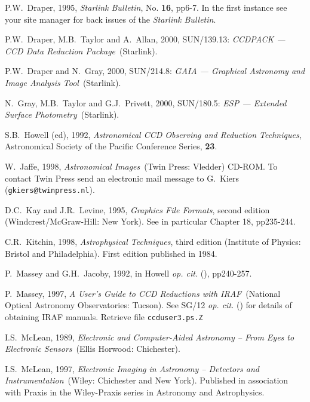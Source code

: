 \documentclass[twoside,11pt]{article}
\newcommand{\htmladdnormallink}[2]{#1}
\newcommand{\latex}[1]{#1}
\newcommand{\xref}[3]{#1}
\begin{document}
\begin{thebibliography}{99}
   P.W.~Draper, 1995,
  \htmladdnormallink{{\it Starlink Bulletin}}
   {http://www.starlink.ac.uk//bulletin.html},
   No. {\bf 16}, pp6-7.  In the first instance see your site manager
   for back issues of the {\it Starlink Bulletin}.

   P.W.~Draper, M.B.~Taylor and A.~Allan, 2000,
   \xref{SUN/139.13}{sun139}{}: {\it CCDPACK --- CCD Data Reduction
   Package}\, (Starlink).

   P.W.~Draper and N.~Gray, 2000,
   \xref{SUN/214.8}{sun214}{}: {\it GAIA --- Graphical Astronomy and Image
   Analysis Tool}\, (Starlink).

   N.~Gray, M.B.~Taylor and G.J.~Privett, 2000,
   \xref{SUN/180.5}{sun180}{}: {\it ESP --- Extended Surface Photometry}\,
   (Starlink).

   S.B.~Howell (ed), 1992, {\it Astronomical CCD
   Observing and Reduction Techniques}, Astronomical Society of the
   Pacific Conference Series, {\bf 23}.

   W.~Jaffe, 1998, {\it Astronomical Images}\,
   (Twin Press: Vledder) CD-ROM.  To contact Twin Press send an electronic
   mail message to G.~Kiers ({\tt gkiers@twinpress.nl}).

   D.C.~Kay and J.R.~Levine, 1995, {\it Graphics File
   Formats}, second edition
  \newline (Windcrest/McGraw-Hill: New York).  See in particular
   Chapter 18, pp235-244.

   C.R.~Kitchin, 1998, {\it Astrophysical Techniques},
   third edition (Institute of Physics: Bristol and Philadelphia).
   First edition published in 1984.

   P.~Massey and G.H.~Jacoby, 1992, in Howell
   {\it op. cit.}\/ (\cite{HOWELL92}), pp240-257.

   P.~Massey, 1997, {\it A User's Guide to CCD
   Reductions with IRAF}\, (National Optical Astronomy Observatories:
   Tucson).  See \xref{SG/12}{sg12}{} {\it op. cit.}\/ (\cite{SG12}) for
   details of obtaining IRAF manuals.  Retrieve file {\tt ccduser3.ps.Z}

   I.S.~McLean, 1989, {\it Electronic and Computer-Aided
   Astronomy -- From Eyes to Electronic Sensors}\, (Ellis Horwood:
   Chichester).

   I.S.~McLean, 1997, {\it Electronic Imaging in
   Astronomy -- Detectors and Instrumentation}\, (Wiley: Chichester and
   New York).  Published in association with Praxis in the Wiley-Praxis
   series in Astronomy and Astrophysics.


\end{thebibliography}
\end{document}
